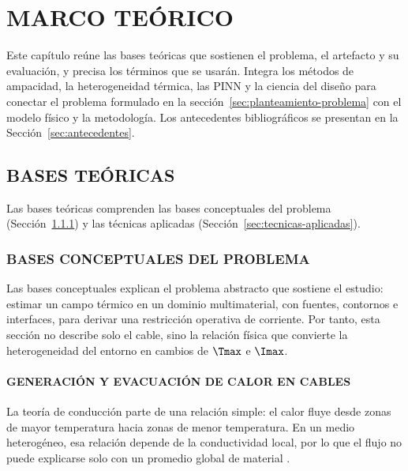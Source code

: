 \chapter{MARCO TEÓRICO}
\label{ch:marco-teorico}
\thispagestyle{empty}

Este capítulo reúne las bases teóricas que sostienen el problema, el artefacto y su evaluación, y precisa los términos que se usarán. Integra los métodos de ampacidad, la heterogeneidad térmica, las PINN y la ciencia del diseño para conectar el problema formulado en la sección~\ref{sec:planteamiento-problema} con el modelo físico y la metodología. Los antecedentes bibliográficos se presentan en la Sección~\ref{sec:antecedentes}.

\section{BASES TEÓRICAS}
\label{sec:bases-teoricas}

Las bases teóricas comprenden las bases conceptuales del problema (Sección~\ref{sec:bases-conceptuales}) y las técnicas aplicadas (Sección~\ref{sec:tecnicas-aplicadas}).

\subsection{BASES CONCEPTUALES DEL PROBLEMA}
\label{sec:bases-conceptuales}

Las bases conceptuales explican el problema abstracto que sostiene el estudio: estimar un campo térmico en un dominio multimaterial, con fuentes, contornos e interfaces, para derivar una restricción operativa de corriente. Por tanto, esta sección no describe solo el cable, sino la relación física que convierte la heterogeneidad del entorno en cambios de $\Tmax$ e $\Imax$.

\subsubsection{GENERACIÓN Y EVACUACIÓN DE CALOR EN CABLES}
\label{subsec:generacion-evacuacion-calor}

La teoría de conducción parte de una relación simple: el calor fluye desde zonas de mayor temperatura hacia zonas de menor temperatura. En un medio heterogéneo, esa relación depende de la conductividad local, por lo que el flujo no puede explicarse solo con un promedio global de material \parencites{carslaw1959conduction,kakac2018heatConduction,hahn2012heatConduction}.

